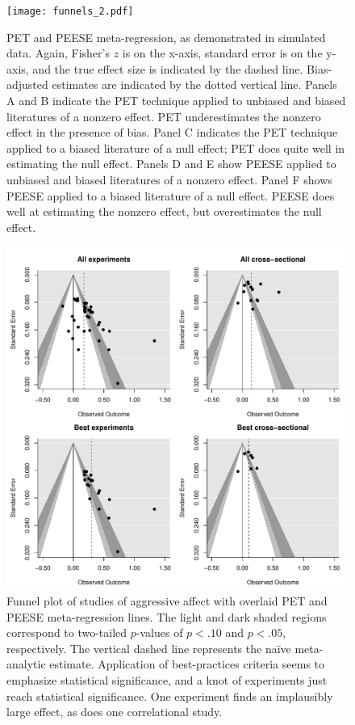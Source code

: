 \documentclass[man]{apa6}
\begin{document}
\begin{figure}
	\texttt{[image: funnels\_2.pdf]}
	\caption{PET and PEESE meta-regression, as demonstrated in simulated data. Again, Fisher's $z$ is on the x-axis, standard error is on the y-axis, and the true effect size is indicated by the dashed line. Bias-adjusted estimates are indicated by the dotted vertical line. Panels A and B indicate the PET technique applied to unbiased and biased literatures of a nonzero effect. PET underestimates the nonzero effect in the presence of bias. Panel C indicates the PET technique applied to a biased literature of a null effect; PET does quite well in estimating the null effect. Panels D and E show PEESE applied to unbiased and biased literatures of a nonzero effect. Panel F shows PEESE applied to a biased literature of a null effect. PEESE does well at estimating the nonzero effect, but overestimates the null effect.}
	\label{funnels2}
\end{figure}

\begin{figure}
	\includegraphics[width = \textwidth, keepaspectratio]{funnels-0_AggAff.pdf}
	\caption{Funnel plot of studies of aggressive affect with overlaid PET and PEESE meta-regression lines. The light and dark shaded regions correspond to two-tailed $p$-values of $p < .10$ and $p < .05$, respectively. The vertical dashed line represents the na{\"i}ve meta-analytic estimate. Application of best-practices criteria seems to emphasize statistical significance, and a knot of experiments just reach statistical significance. One experiment \citep{Ballard:Wiest:1996} finds an implausibly large effect, as does one correlational study.}
	\label{funnel-aggaff}
\end{figure}
\end{document}
